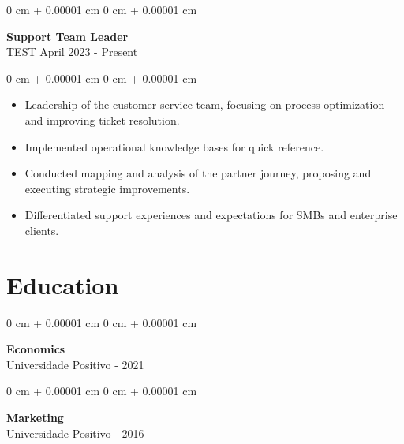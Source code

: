 \documentclass[10pt, letterpaper]{article}
\newenvironment{highlights}{
    \begin{itemize}[
        topsep=0.10 cm,
        parsep=0.10 cm,
        partopsep=0pt,
        itemsep=0pt,
        leftmargin=0 cm + 10pt
    ]
}{
    \end{itemize}
}
\newenvironment{onecolentry}{
    \begin{adjustwidth}{
        0 cm + 0.00001 cm
    }{
        0 cm + 0.00001 cm
    }
}{
    \end{adjustwidth}
}
\begin{document}
\vspace{0.2cm}

\begin{onecolentry}
    \setcolumnwidth{\fill, 4.5cm}
    \begin{paracol}{2}
        \textbf{Support Team Leader} \\ TEST
        \switchcolumn
        \raggedleft April 2023 - Present
    \end{paracol}
\end{onecolentry}
\vspace{0.10cm}
\begin{onecolentry}
    \begin{highlights}
                \item Leadership of the customer service team, focusing on process optimization and improving ticket resolution.
                \item Implemented operational knowledge bases for quick reference.
                \item Conducted mapping and analysis of the partner journey, proposing and executing strategic improvements.
                \item Differentiated support experiences and expectations for SMBs and enterprise clients.
    \end{highlights}
\end{onecolentry}

\section{Education}

\begin{onecolentry}
    \setcolumnwidth{\fill, 4.5cm}
    \begin{paracol}{2}
        \textbf{Economics} \\ Universidade Positivo
        \switchcolumn
         - 2021
    \end{paracol}
\end{onecolentry}
\vspace{0.2cm}

\begin{onecolentry}
    \setcolumnwidth{\fill, 4.5cm}
    \begin{paracol}{2}
        \textbf{Marketing} \\ Universidade Positivo
        \switchcolumn
         - 2016
    \end{paracol}
\end{onecolentry}
\end{document}
